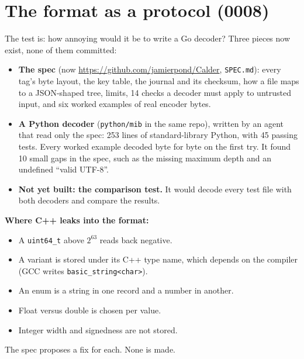 \documentclass[11pt,a4paper]{article}
\newcommand{\code}[1]{\texttt{#1}}
\begin{document}
\section{The format as a protocol (0008)}

The test is: how annoying would it be to write a Go decoder? Three pieces now exist, none of them committed:
\begin{itemize}
  \item \textbf{The spec} (now \url{https://github.com/jamierpond/Calder}, \code{SPEC.md}): every tag's byte layout, the key table, the journal and its checksum, how a file maps to a JSON-shaped tree, limits, 14 checks a decoder must apply to untrusted input, and six worked examples of real encoder bytes.
  \item \textbf{A Python decoder} (\code{python/mib} in the same repo), written by an agent that read only the spec: 253 lines of standard-library Python, with 45 passing tests. Every worked example decoded byte for byte on the first try. It found 10 small gaps in the spec, such as the missing maximum depth and an undefined ``valid UTF-8''.
  \item \textbf{Not yet built: the comparison test.} It would decode every test file with both decoders and compare the results.
\end{itemize}

\textbf{Where C++ leaks into the format:}
\begin{itemize}
  \item A \code{uint64\_t} above $2^{63}$ reads back negative.
  \item A variant is stored under its C++ type name, which depends on the compiler (GCC writes \code{basic\_string<char>}).
  \item An enum is a string in one record and a number in another.
  \item Float versus double is chosen per value.
  \item Integer width and signedness are not stored.
\end{itemize}
The spec proposes a fix for each. None is made.
\end{document}
